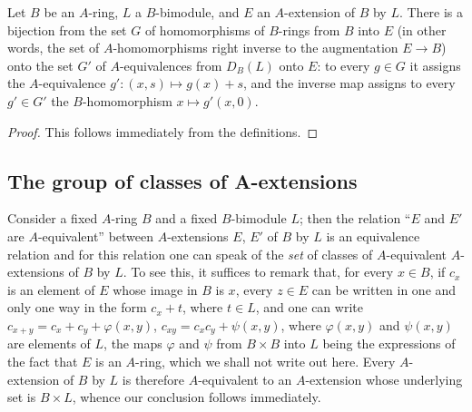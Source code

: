 \begin{proposition}[18.2.10]
\label{0.18.2.10}
Let $B$ be an $A$-ring, $L$ a $B$-bimodule, and $E$ an $A$-extension of $B$ by $L$.
There is a bijection from the set $G$ of homomorphisms of $B$-rings from $B$ into $E$ (in other words, the set of $A$-homomorphisms right inverse to the augmentation $E\to B$) onto the set $G'$ of $A$-equivalences from $D_B(L)$ onto $E$: to every $g\in G$ it assigns the $A$-equivalence $g':(x,s)\mapsto g(x)+s$, and the inverse map assigns to every $g'\in G'$ the $B$-homomorphism $x\mapsto g'(x,0)$.
\end{proposition}

\begin{proof}
This follows immediately from the definitions.
\end{proof}

\subsection{The group of classes of A-extensions}
\label{subsection:0.18.3}

\begin{env}[18.3.1]
\label{0.18.3.1}
Consider a fixed $A$-ring $B$ and a fixed $B$-bimodule $L$; then the relation ``$E$ and $E'$ are $A$-equivalent'' between $A$-extensions $E$, $E'$ of $B$ by $L$ is an equivalence relation and for this relation one can speak of the \emph{set} of classes of $A$-equivalent $A$-extensions of $B$ by $L$.
To see this, it suffices to remark that, for every $x\in B$, if $c_x$ is an element of $E$ whose image in $B$ is $x$, every $z\in E$ can be written in one and only one way in the form $c_x+t$, where $t\in L$, and one can write $c_{x+y}=c_x+c_y+\varphi(x,y)$, $c_{xy}=c_x c_y+\psi(x,y)$, where $\varphi(x,y)$ and $\psi(x,y)$ are elements of $L$, the maps $\varphi$ and $\psi$ from $B\times B$ into $L$ being the expressions of the fact that $E$ is an $A$-ring, which we shall not write out here.
Every $A$-extension of $B$ by $L$ is therefore $A$-equivalent to an $A$-extension whose underlying set is $B\times L$, whence our conclusion follows immediately.
\end{env}

